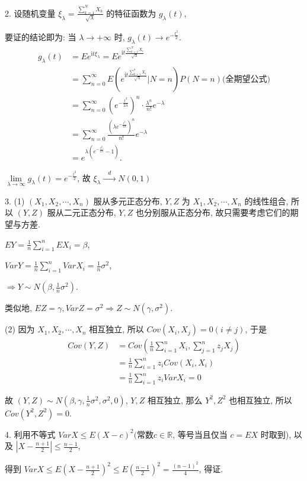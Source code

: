 \documentclass[UTF8]{ctexart}
\begin{document}
2. 设随机变量 $\displaystyle \xi_{\lambda}=\frac{\sum\limits_{k=1}^{N}X_k}{\sqrt{\lambda}}$ 的特征函数为 $g_{\lambda}(t)$,

要证的结论即为: 当 $\lambda\rightarrow+\infty$ 时, $\displaystyle g_{\lambda}(t)\rightarrow e^{-\frac{t^2}{2}}$.
\[
\begin{aligned}
g_{\lambda}(t)&=Ee^{\text{i}t\xi_{\lambda}}=Ee^{\text{i}t\frac{\sum\limits_{k=1}^{N}X_i}{\sqrt{\lambda}}}\\
              &=\sum\limits_{n=0}^{\infty}E\left(e^{\text{i}t\frac{\sum\limits_{k=1}^{n}X_i}{\sqrt{\lambda}}}\Bigg|N=n\right)P(N=n)\text{(全期望公式)}\\
              &=\sum\limits_{n=0}^{\infty}\left(e^{-\frac{t^2}{2\lambda}}\right)^n\cdot\frac{\lambda^n}{n!}e^{-\lambda}\\
              &=\sum\limits_{n=0}^{\infty}\frac{\left(\lambda e^{-\frac{t^2}{2\lambda}}\right)^n}{n!}e^{-\lambda}\\
              &=e^{\lambda\left(e^{-\frac{t^2}{2\lambda}}-1\right)}.
\end{aligned}
\]

$\displaystyle\lim\limits_{\lambda\rightarrow\infty}g_\lambda(t)=e^{-\frac{t^2}{2}}$, 故 $\xi_\lambda\xrightarrow{\;\;\; d \;\;\; }N(0,1)$

3. (1) $(X_1,X_2,\cdots,X_n)$ 服从多元正态分布, $Y,Z$ 为 $X_1,X_2,\cdots,X_n$ 的线性组合, 所以 $(Y,Z)$ 服从二元正态分布, $Y,Z$ 也分别服从正态分布, 故只需要考虑它们的期望与方差.

$\displaystyle EY=\frac{1}{n}\sum\limits_{i=1}^{n}EX_i=\beta$,

$\displaystyle VarY=\frac{1}{n}\sum\limits_{i=1}^{n}VarX_i=\frac{1}{n}\sigma^2$,

$\displaystyle \Rightarrow Y\sim N\left(\beta,\frac{1}{n}\sigma^2\right)$.

类似地, $EZ=\gamma, VarZ=\sigma^2\Rightarrow Z\sim N\left(\gamma,\sigma^2\right)$.

(2) 因为 $X_1,X_2,\cdots,X_n$ 相互独立, 所以 $Cov(X_i,X_j)=0(i\neq j)$, 于是
\[
\begin{aligned}
Cov(Y,Z)&=Cov\left(\frac{1}{n}\sum\limits_{i=1}^{n}X_i,\sum\limits_{j=1}^{n}z_jX_j\right)\\
        &=\frac{1}{n}\sum\limits_{i=1}^{n}z_iCov(X_i,X_i)\\
        &=\frac{1}{n}\sum\limits_{i=1}^{n}z_iVarX_i=0
\end{aligned}
\]

故 $\displaystyle (Y,Z)\sim N\left(\beta,\gamma,\frac{1}{n}\sigma^2,\sigma^2,0\right)$, $Y,Z$ 相互独立, 那么 $Y^2,Z^2$ 也相互独立, 所以 $Cov\left(Y^2,Z^2\right)=0$.

4. 利用不等式 $Var X\leq E(X-c)^2(\text{常数}c\in \mathbb{R}$, 等号当且仅当 $c=EX$ 时取到), 以及 $\displaystyle\left|X-\frac{n+1}{2}\right|\leq\frac{n-1}{2}$,

得到 $\displaystyle VarX\leq E\left(X-\frac{n+1}{2}\right)^2\leq E\left(\frac{n-1}{2}\right)^2=\frac{(n-1)^2}{4}$, 得证.
\end{document}
